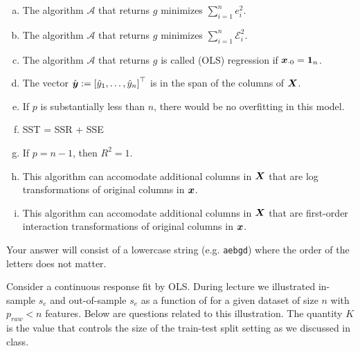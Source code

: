 \documentclass[12pt,landscape]{article}
\newcommand{\instr}{\small Your answer will consist of a lowercase string (e.g. \texttt{aebgd}) where the order of the letters does not matter. \normalsize}
\begin{document}
\benum{}

\begin{enumerate}[(a)]
\item The algorithm $\mathcal{A}$ that returns $g$ minimizes $\sum_{i=1}^n e_i^2$.
\item The algorithm $\mathcal{A}$ that returns $g$ minimizes $\sum_{i=1}^n \mathcal{E}_i^2$.
\item The algorithm $\mathcal{A}$ that returns $g$ is called  (OLS) regression if $\boldsymbol{x}_{\cdot 0} = \boldsymbol{1}_n$.
\item The vector $\hat{\boldsymbol{y}} := \left[\hat{y}_1, \ldots, \hat{y}_n\right]^\top$ is in the span of the columns of $\boldsymbol{X}$.
\item If $p$ is substantially less than $n$, there would be no overfitting in this model.
\item SST = SSR + SSE
\item If $p=n-1$, then $R^2 = 1$.
\item This algorithm can accomodate additional columns in $\boldsymbol{X}$ that are log transformations of original columns in $\boldsymbol{x}$.
\item This algorithm can accomodate additional columns in $\boldsymbol{X}$ that are first-order interaction transformations of original columns in $\boldsymbol{x}$.
\end{enumerate}
\eenum\instr\pagebreak


\problem{} Consider a continuous response fit by OLS. During lecture we illustrated in-sample $s_e$ and out-of-sample $s_e$ as a function of  for a given dataset of size $n$ with $p_{raw} < n$ features. Below are questions related to this illustration. The quantity $K$ is the value that controls the size of the train-test split setting as we discussed in class.

\benum{}
\end{document}

